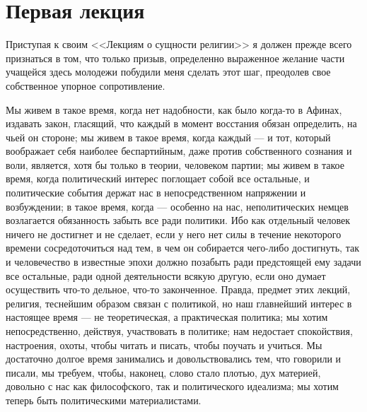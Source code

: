 \documentclass[12pt]{article}
\begin{document}
\section*{Первая лекция}

Приступая к своим <<Лекциям о сущности религии>>  я должен прежде всего признаться в том, что только призыв, определенно выраженное желание части учащейся здесь молодежи побудили меня сделать этот шаг, преодолев свое собственное упорное сопротивление. 

Мы живем в такое время, когда нет надобности, как было когда-то в Афинах, издавать закон, гласящий, что каждый в момент восстания обязан определить, на чьей он стороне; мы живем в такое время, когда каждый --- и тот, который воображает себя наиболее беспартийным, даже против собственного сознания и воли, является, хотя бы только в теории, человеком партии; мы живем в такое время, когда политический интерес поглощает собой все остальные, и политические события держат нас в непосредственном напряжении и возбуждении; в такое время, когда --- особенно на нас, неполитических немцев возлагается обязанность забыть все ради политики. Ибо как отдельный человек ничего не достигнет и не сделает, если у него нет силы в течение некоторого времени сосредоточиться над тем, в чем он собирается чего-либо достигнуть, так и человечество в известные эпохи должно позабыть ради предстоящей ему задачи все остальные, ради одной деятельности всякую другую, если оно думает осуществить что-то дельное, что-то законченное. Правда, предмет этих лекций, религия, теснейшим образом связан с политикой, но наш главнейший интерес в настоящее время --- не теоретическая, а практическая политика; мы хотим непосредственно, действуя, участвовать в политике; нам недостает спокойствия, настроения, охоты, чтобы читать и писать, чтобы поучать и учиться. Мы достаточно долгое время занимались и довольствовались тем, что говорили и писали, мы требуем, чтобы, наконец, слово стало плотью, дух материей, довольно с нас как философского, так и политического идеализма; мы хотим теперь быть политическими материалистами. 
\end{document}
